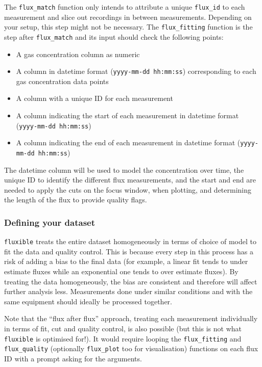 \documentclass[
  letterpaper,
  DIV=11,
  numbers=noendperiod]{scrartcl}
\providecommand{\tightlist}{%
  \setlength{\itemsep}{0pt}\setlength{\parskip}{0pt}}\usepackage{longtable,booktabs,array}
\begin{document}
The \texttt{flux\_match} function only intends to attribute a unique
\texttt{flux\_id} to each measurement and slice out recordings in
between measurements. Depending on your setup, this step might not be
necessary. The \texttt{flux\_fitting} function is the step after
\texttt{flux\_match} and its input should check the following points:

\begin{itemize}
\tightlist
\item
  A gas concentration column as numeric
\item
  A column in datetime format (\texttt{yyyy-mm-dd\ hh:mm:ss})
  corresponding to each gas concentration data points
\item
  A column with a unique ID for each measurement
\item
  A column indicating the start of each measurement in datetime format
  (\texttt{yyyy-mm-dd\ hh:mm:ss})
\item
  A column indicating the end of each measurement in datetime format
  (\texttt{yyyy-mm-dd\ hh:mm:ss})
\end{itemize}

The datetime column will be used to model the concentration over time,
the unique ID to identify the different flux measurements, and the start
and end are needed to apply the cuts on the focus window, when plotting,
and determining the length of the flux to provide quality flags.

\subsubsection{Defining your dataset}\label{defining-your-dataset}

\texttt{fluxible} treats the entire dataset homogeneously in terms of
choice of model to fit the data and quality control. This is because
every step in this process has a risk of adding a bias to the final data
(for example, a linear fit tends to under estimate fluxes while an
exponential one tends to over estimate fluxes). By treating the data
homogeneously, the bias are consistent and therefore will affect further
analysis less. Measurements done under similar conditions and with the
same equipment should ideally be processed together.

Note that the ``flux after flux'' approach, treating each measurement
individually in terms of fit, cut and quality control, is also possible
(but this is not what \texttt{fluxible} is optimised for!). It would
require looping the \texttt{flux\_fitting} and \texttt{flux\_quality}
(optionally \texttt{flux\_plot} too for visualisation) functions on each
flux ID with a prompt asking for the arguments.
\end{document}
